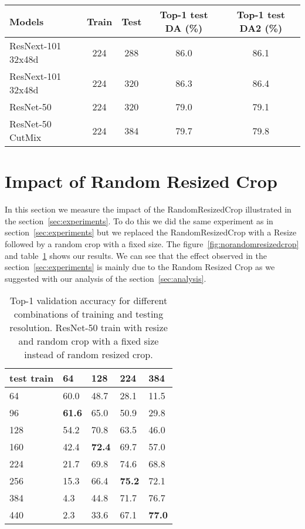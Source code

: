 \documentclass{article}
\begin{document}
\begin{table*}
\centering
\small
\begin{tabular}{lcccc}
    \toprule 
    Models & Train  & Test & Top-1 test DA (\%) & Top-1 test DA2 (\%) \\
    \midrule
    ResNext-101 32x48d  & 224 & 288 & 86.0 & 86.1 \\
    ResNext-101 32x48d & 224 & 320 & 86.3 & 86.4 \\
    \midrule
    ResNet-50  & 224 & 320 & 79.0 & 79.1 \\
    \midrule
    ResNet-50 CutMix & 224 & 384 & 79.7 & 79.8  \\
    \bottomrule
\end{tabular}
\smallskip
\caption{\label{tab:dataaugmentationcomparison}
Comparisons of performance between data-augmentation test DA and test DA2 in the case of fine-tuning batch-norm and classifier.
}
\end{table*}


\section{Impact of Random Resized Crop}
\label{sec:RandomResizedCropEffect}
In this section we measure the impact of the RandomResizedCrop illustrated in the section~\ref{sec:experiments}.
To do this we did the same experiment as in section~\ref{sec:experiments} but we replaced the RandomResizedCrop with a Resize followed by a random crop with a fixed size.
The figure~\ref{fig:norandomresizedcrop} and table~\ref{tab:norandomresizedcrop} shows our results. 
We can see that the effect observed in the section~\ref{sec:experiments} is mainly due to the Random Resized Crop as we suggested with our analysis of the section~\ref{sec:analysis}.

\begin{table}
  \centering
  \begin{tabular}{l|llll}
    \toprule
    test  train     & 64 & 128 & 224 & 384 \\
    \midrule
    64 & 60.0 & 48.7 & 28.1 & 11.5 \\
    96 & \textbf{61.6} & 65.0 & 50.9 & 29.8 \\
    128 & 54.2 & 70.8 & 63.5 & 46.0 \\
    160 & 42.4 & \textbf{72.4} & 69.7 & 57.0 \\
    224 & 21.7 & 69.8 & 74.6 & 68.8 \\
    256 & 15.3 & 66.4 & \textbf{75.2} & 72.1 \\
    384 & 4.3 & 44.8 & 71.7 & 76.7 \\
    440 & 2.3 & 33.6 & 67.1 & \textbf{77.0} \\
    \bottomrule
\end{tabular}
\caption{\label{tab:norandomresizedcrop}
	Top-1 validation accuracy for different combinations of training and testing resolution. 
ResNet-50 train with resize and random crop with a fixed size instead of random resized crop.
}
\end{table}
\end{document}

